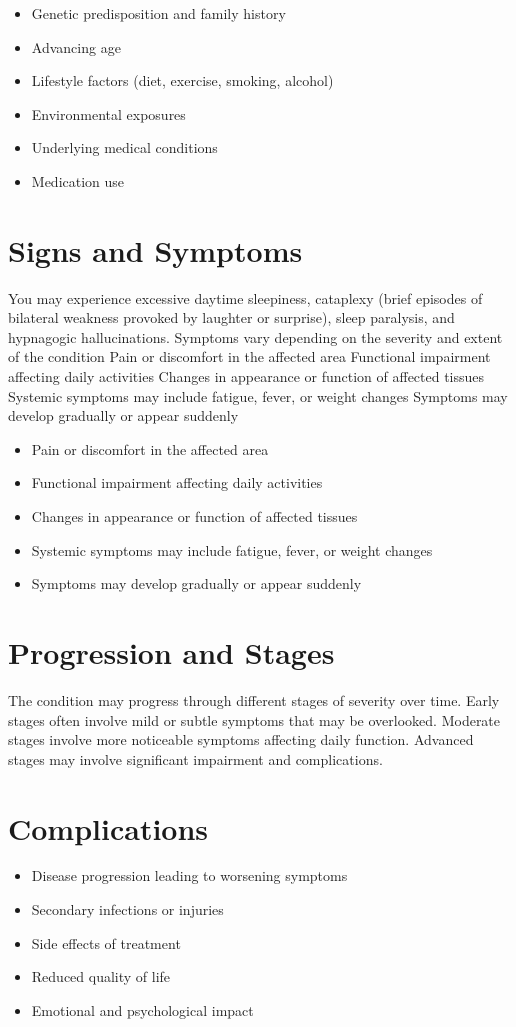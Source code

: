 \begin{itemize}[noitemsep]
  \item Genetic predisposition and family history
  \item Advancing age
  \item Lifestyle factors (diet, exercise, smoking, alcohol)
  \item Environmental exposures
  \item Underlying medical conditions
  \item Medication use
\end{itemize}
\section{Signs and Symptoms}
You may experience excessive daytime sleepiness, cataplexy (brief episodes of bilateral weakness provoked by laughter or surprise), sleep paralysis, and hypnagogic hallucinations. Symptoms vary depending on the severity and extent of the condition Pain or discomfort in the affected area Functional impairment affecting daily activities Changes in appearance or function of affected tissues Systemic symptoms may include fatigue, fever, or weight changes Symptoms may develop gradually or appear suddenly

\begin{itemize}[noitemsep]
  \item Pain or discomfort in the affected area
  \item Functional impairment affecting daily activities
  \item Changes in appearance or function of affected tissues
  \item Systemic symptoms may include fatigue, fever, or weight changes
  \item Symptoms may develop gradually or appear suddenly
\end{itemize}
\section{Progression and Stages}
The condition may progress through different stages of severity over time. Early stages often involve mild or subtle symptoms that may be overlooked. Moderate stages involve more noticeable symptoms affecting daily function. Advanced stages may involve significant impairment and complications.
\section{Complications}
\begin{itemize}[noitemsep]
  \item Disease progression leading to worsening symptoms
  \item Secondary infections or injuries
  \item Side effects of treatment
  \item Reduced quality of life
  \item Emotional and psychological impact
\end{itemize}
